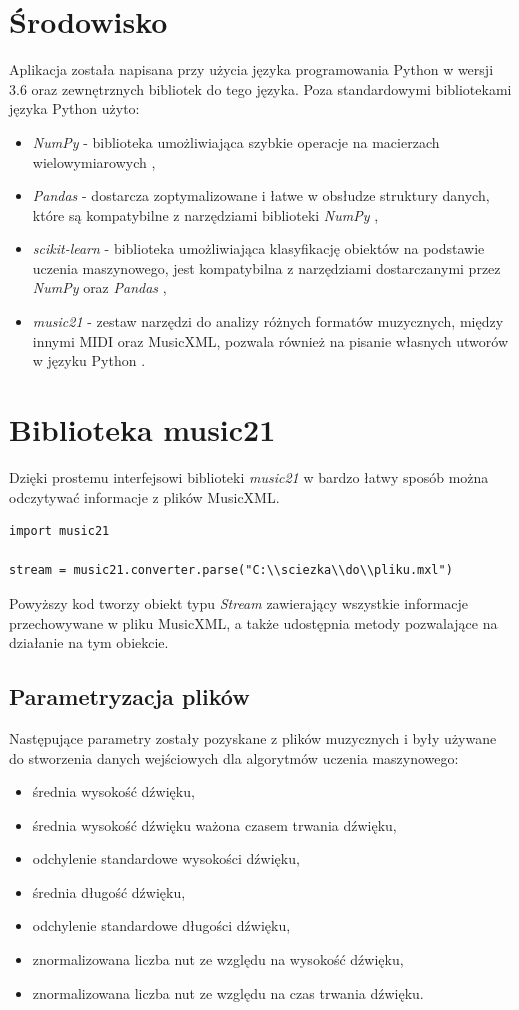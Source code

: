 \documentclass[printmode, eng, openany]{mgr}
\newcommand\tab[1][1cm]{\hspace*{#1}}
\begin{document}
\section{Środowisko}
\tab Aplikacja została napisana przy użycia języka programowania Python w wersji 3.6 oraz zewnętrznych bibliotek do tego języka. Poza standardowymi bibliotekami języka Python użyto:
\begin{itemize}
\item \textit{NumPy} - biblioteka umożliwiająca szybkie operacje na macierzach wielowymiarowych \cite{numpy},
\item \textit{Pandas} - dostarcza zoptymalizowane i łatwe w obsłudze struktury danych, które są kompatybilne z narzędziami biblioteki \textit{NumPy} \cite{pandas},
\item \textit{scikit-learn} - biblioteka umożliwiająca klasyfikację obiektów na podstawie uczenia maszynowego, jest kompatybilna z narzędziami dostarczanymi przez \textit{NumPy} oraz \textit{Pandas} \cite{sci},
\item \textit{music21} - zestaw narzędzi do analizy różnych formatów muzycznych, między innymi MIDI oraz MusicXML, pozwala również na pisanie własnych utworów w języku Python \cite{m21}. 
\end{itemize}
\section{Biblioteka music21}
\tab Dzięki prostemu interfejsowi biblioteki \textit{music21} w bardzo łatwy sposób można odczytywać informacje z plików MusicXML.
\begin{lstlisting}
import music21

stream = music21.converter.parse("C:\\sciezka\\do\\pliku.mxl")
\end{lstlisting}
\tab Powyższy kod tworzy obiekt typu \textit{Stream} zawierający wszystkie informacje przechowywane w pliku MusicXML, a także udostępnia metody pozwalające na działanie na tym obiekcie. 
\subsection{Parametryzacja plików}
\tab Następujące parametry zostały pozyskane z plików muzycznych i były używane do stworzenia danych wejściowych dla algorytmów uczenia maszynowego:
\begin{itemize}
\item średnia wysokość dźwięku,
\item średnia wysokość dźwięku ważona czasem trwania dźwięku,
\item odchylenie standardowe wysokości dźwięku,
\item średnia długość dźwięku,
\item odchylenie standardowe długości dźwięku,
\item znormalizowana liczba nut ze względu na wysokość dźwięku,
\item znormalizowana liczba nut ze względu na czas trwania dźwięku.
\end{itemize}
\end{document}
